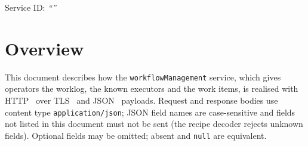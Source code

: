 \documentclass[a4paper]{arrowhead}
\begin{document}
\ArrowheadSetup

\begin{center}
  \vspace*{1cm}
  \huge{\arrowtitle}

  \vspace*{0.2cm}
  \LARGE{\arrowtype}
  \vspace*{1cm}

  \Large{Service ID: \textit{``\arrowid''}}
  \vspace*{\fill}

  

  \vspace*{1cm}
  \vspace*{\fill}

  \begin{abstract}
    This document describes the HTTP/TLS/JSON interface of the \texttt{workflowManagement} service of the Eclipse Arrowhead workflow support systems, service version 1.0.0, documentation edition 5.4.0. It realises the abstract operations of the \texttt{workflowManagement} SD.
  \end{abstract}

  \vspace*{1cm}
\end{center}

\newpage

\tableofcontents
\newpage

\section{Overview}
\label{sec:overview}
This document describes how the \texttt{workflowManagement} service, which gives operators the worklog, the known executors and the work items, is realised with HTTP~\cite{rfc9110}
over TLS~\cite{rfc8446} and JSON~\cite{rfc8259} payloads. Request and response bodies use content type
\texttt{application/json}; JSON field names are case-sensitive and fields not listed in this document must not be sent
(the recipe decoder rejects unknown fields). Optional fields may be omitted; absent and \texttt{null} are equivalent.
\end{document}
